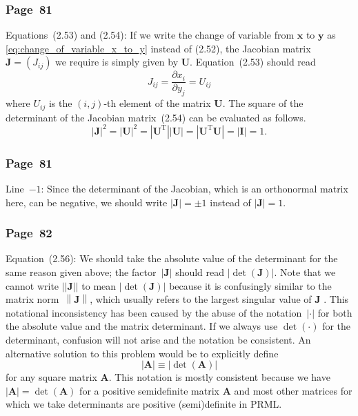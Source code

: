 \documentclass[12pt,a4paper]{article}
\newcommand{\erratum}[1]{\subsubsection*{#1}}
\begin{document}
\erratum{Page~81}
Equations~(2.53) and (2.54):
If we write the change of variable from $\mathbf{x}$ to $\mathbf{y}$ as
\eqref{eq:change_of_variable_x_to_y} instead of (2.52),
the Jacobian matrix~$\mathbf{J} = \left( J_{ij} \right)$ we require is
simply given by $\mathbf{U}$.
Equation~(2.53) should read
\begin{equation}
J_{ij} = \frac{\partial x_i}{\partial y_j} = U_{ij}
\end{equation}
where $U_{ij}$ is the $(i, j)$-th element of the matrix $\mathbf{U}$.
The square of the determinant of the Jacobian matrix~(2.54) can be evaluated as follows.
\begin{equation}
\left| \mathbf{J} \right|^{2} = \left| \mathbf{U} \right|^{2}
= \left| \mathbf{U}^{\operatorname{T}} \right| \left| \mathbf{U} \right|
= \left| \mathbf{U}^{\operatorname{T}} \mathbf{U} \right|
= \left| \mathbf{I} \right| = 1.
\end{equation}

\erratum{Page~81}
Line~$-1$:
Since the determinant of the Jacobian, which is an orthonormal matrix here, can be negative,
we should write $\left| \mathbf{J} \right| = \pm 1$
instead of $\left| \mathbf{J} \right| = 1$.

\erratum{Page~82}
Equation~(2.56):
We should take the absolute value of the determinant for the same reason given above;
the factor~$\left| \mathbf{J} \right|$ should read
$\left| \operatorname{det}\left( \mathbf{J} \right) \right|$.
Note that we cannot write $\left|\left| \mathbf{J} \right|\right|$ to mean
$\left| \operatorname{det}\left( \mathbf{J} \right) \right|$
because it is confusingly similar to the matrix norm~$\left\| \mathbf{J} \right\|$,
which usually refers to the largest singular value of $\mathbf{J}$ \citep{GvL:MC}.
This notational inconsistency has been caused by the abuse of the notation~$|\cdot|$ for
both the absolute value and the matrix determinant.
If we always use $\operatorname{det}(\cdot)$ for the determinant, confusion will not arise
and the notation be consistent.
An alternative solution to this problem would be to explicitly define
\begin{equation}
\left| \mathbf{A} \right| \equiv \left| \operatorname{det}\left( \mathbf{A} \right) \right|
\end{equation}
for any square matrix $\mathbf{A}$.
This notation is mostly consistent because we have
$\left| \mathbf{A} \right| = \operatorname{det}\left( \mathbf{A} \right)$ for a positive
semidefinite matrix $\mathbf{A}$ and
most other matrices for which we take determinants are positive (semi)definite in PRML.
\end{document}
